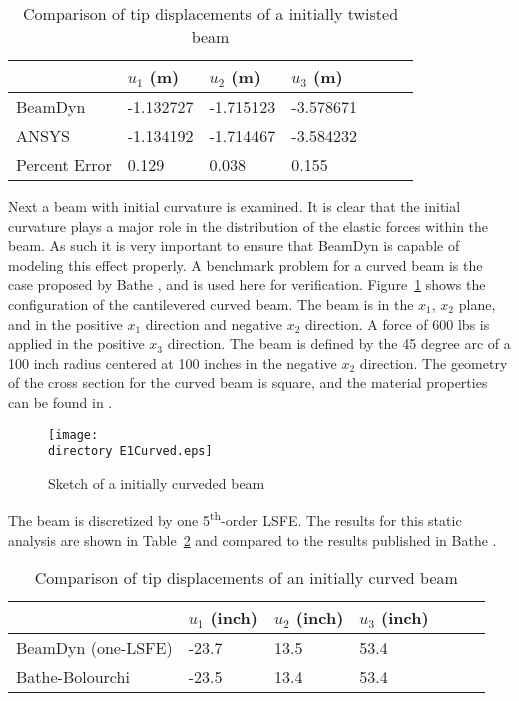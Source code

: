 \documentclass{aiaa-tc}
\def\directory{EPSF/}
\begin{document}
\begin{table}
\caption{\label{E1u} Comparison of tip displacements of a initially twisted beam} 
\begin{center} 
    \begin{tabular}{| l | l | l | l | l | l | l |}
    	\hline
    	        & $u_1$ (m) & $u_2$ (m) & $u_3$ (m)  \\ \hline
    	BeamDyn  & -1.132727     & -1.715123       & -3.578671      \\  \hline
    	ANSYS   & -1.134192     & -1.714467      & -3.584232     \\ \hline
    	Percent Error   & 0.129     & 0.038      & 0.155     \\ \hline
    \end{tabular}
\end{center}
\end{table} 

Next a beam with initial curvature is examined. It is clear that the initial curvature plays a major role in the distribution of the elastic forces within the beam. As such it is very important to ensure that BeamDyn is capable of modeling this effect properly. A benchmark problem for a curved beam is the case proposed by Bathe \cite{Bathe1979}, and is used here for verification. Figure~\ref{E1Curved} shows the configuration of the cantilevered curved beam. The beam is in the $x_1$, $x_2$ plane, and in the positive $x_1$ direction and negative $x_2$ direction. A force of 600 lbs is applied in the positive $x_3$ direction. The beam is defined by the 45 degree arc of a 100 inch radius centered at 100 inches in the negative $x_2$ direction.  The geometry of the cross section for the curved beam is square, and the material properties can be found in \cite{Bathe1979}. 
\begin{figure}
\centering
\texttt{[image: \\directory E1Curved.eps]}
\caption{Sketch of a initially curveded beam} 
\label{E1Curved}
\end{figure}
The beam is discretized by one 5\textsuperscript{th}-order LSFE. The results for this static analysis are shown in Table~\ref{E1CurvedDisp} and compared to the results published in Bathe \cite{Bathe1979}.

\begin{table}
\caption{\label{E1CurvedDisp} Comparison of tip displacements of an initially curved beam } 
\begin{center}
    \begin{tabular}{| l | l | l | l | l | l | l |}
    	\hline
    	        & $u_1$ (inch) & $u_2$ (inch) & $u_3$ (inch)  \\ \hline
    	BeamDyn (one-LSFE) & -23.7     & 13.5       & 53.4      \\  \hline
    	Bathe-Bolourchi \cite{Bathe1979}   & -23.5     & 13.4       & 53.4     \\ \hline
    \end{tabular}
\end{center}
\end{table} 
\end{document}
